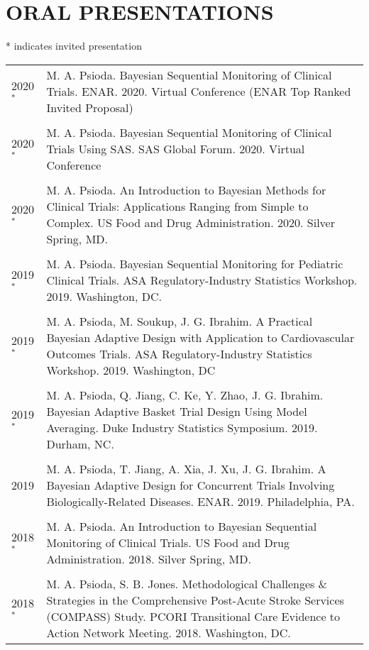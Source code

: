 \documentclass[11pt]{article}
\begin{document}
\section*{\large \bf ORAL PRESENTATIONS}
* indicates invited presentation \\ %

\begin{tabular}[!h]{p{2.0cm}p{13.2cm}}

2020$^*$ &  M. A. Psioda. Bayesian Sequential Monitoring of Clinical Trials. 
        ENAR. 2020. Virtual Conference (ENAR Top Ranked Invited Proposal) \\ & \\
2020$^*$ &  M. A. Psioda. Bayesian Sequential Monitoring of Clinical Trials Using SAS. 
        SAS Global Forum. 2020. Virtual Conference \\ & \\
2020$^*$ &  M. A. Psioda. An Introduction to Bayesian Methods for Clinical Trials: Applications Ranging from Simple to Complex. 
        US Food and Drug Administration. 2020. Silver Spring, MD. \\ & \\
2019$^*$ &  M. A. Psioda. Bayesian Sequential Monitoring for Pediatric Clinical Trials. 
            ASA Regulatory-Industry Statistics Workshop. 2019. Washington, DC.\\ & \\
2019$^*$ &  M. A. Psioda, M. Soukup, J. G. Ibrahim. A Practical Bayesian Adaptive Design with Application to
        Cardiovascular Outcomes Trials. ASA Regulatory-Industry Statistics Workshop. 2019. Washington, DC\\ & \\
2019$^*$ &  M. A. Psioda, Q. Jiang, C. Ke, Y. Zhao, J. G. Ibrahim. Bayesian Adaptive Basket Trial Design Using
        Model Averaging. Duke Industry Statistics Symposium. 2019. Durham, NC.\\ & \\
2019 &  M. A. Psioda, T. Jiang, A. Xia, J. Xu, J. G. Ibrahim. A Bayesian Adaptive Design for Concurrent
        Trials Involving Biologically-Related Diseases. ENAR. 2019. Philadelphia, PA.\\ & \\
2018$^*$ &  M. A. Psioda. An Introduction to Bayesian Sequential Monitoring of Clinical Trials. 
        US Food and Drug Administration. 2018. Silver Spring, MD. \\ & \\
2018$^*$ &  M. A. Psioda, S. B. Jones. Methodological Challenges \& Strategies in the Comprehensive Post-Acute
            Stroke Services (COMPASS) Study. PCORI Transitional Care Evidence to Action Network Meeting.
						2018. Washington, DC. 
\end{tabular}	
\end{document}
